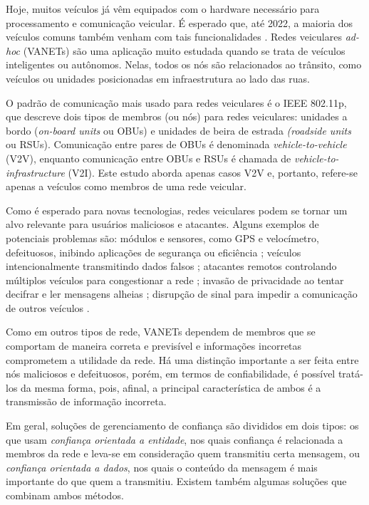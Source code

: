 \begin{resumoextendido}
	Hoje, muitos veículos já vêm equipados com o hardware necessário para processamento e comunicação veicular.
	É esperado que, até 2022, a maioria dos veículos comuns também venham com tais funcionalidades \citep{connectedcar2016}.
	Redes veiculares \textit{ad-hoc} (VANETs) são uma aplicação muito estudada quando se trata de veículos inteligentes ou autônomos.
	Nelas, todos os nós são relacionados ao trânsito, como veículos ou unidades posicionadas em infraestrutura ao lado das ruas.
	
	O padrão de comunicação mais usado para redes veiculares é o IEEE 802.11p, que descreve dois tipos de membros (ou nós) para redes veiculares: unidades a bordo (\textit{on-board units} ou OBUs) e unidades de beira de estrada \textit(\textit{roadside units} ou RSUs).
	Comunicação entre pares de OBUs é denominada \textit{vehicle-to-vehicle} (V2V), enquanto comunicação entre OBUs e RSUs é chamada de \textit{vehicle-to-infrastructure} (V2I).
	Este estudo aborda apenas casos V2V e, portanto, refere-se apenas a veículos como membros de uma rede veicular.

	Como é esperado para novas tecnologias, redes veiculares podem se tornar um alvo relevante para usuários maliciosos e atacantes.
	Alguns exemplos de potenciais problemas são: 
	módulos e sensores, como GPS e velocímetro, defeituosos, inibindo aplicações de segurança ou eficiência \citep{isaac2010security}; 
	veículos intencionalmente transmitindo dados falsos \citep{golle2004detecting}; 
	atacantes remotos controlando múltiplos veículos para congestionar a rede \citep{garip2015congestion}; 
	invasão de privacidade ao tentar decifrar e ler mensagens alheias \citep{isaac2010security};
	disrupção de sinal para impedir a comunicação de outros veículos \citep{isaac2010security}.
	
	Como em outros tipos de rede, VANETs dependem de membros que se comportam de maneira correta e previsível e informações incorretas comprometem a utilidade da rede.
	Há uma distinção importante a ser feita entre nós maliciosos e defeituosos, porém, em termos de confiabilidade, é possível tratá-los da mesma forma, pois, afinal, a principal característica de ambos é a transmissão de informação incorreta.
	
	Em geral, soluções de gerenciamento de confiança são divididos em dois tipos: os que usam \textit{confiança orientada a entidade}, nos quais confiança é relacionada a membros da rede e leva-se em consideração quem transmitiu certa mensagem, ou \textit{confiança orientada a dados}, nos quais o conteúdo da mensagem é mais importante do que quem a transmitiu.
	Existem também algumas soluções que combinam ambos métodos.
	

\end{resumoextendido}
